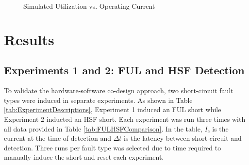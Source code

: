 \documentclass[11pt,oneside]{report}
\begin{document}
    \begin{figure}
    \centering
        \caption{Simulated Utilization vs. Operating Current}
        \label{fig:Simulated Utilization}
    \end{figure}

    \chapter{Results}\label{chap:results}
    \section{Experiments 1 and 2: FUL and HSF Detection}
    To validate the hardware-software co-design approach, two short-circuit fault types were induced in separate experiments. As shown in Table \ref{tab:ExperimentDescriptions}, Experiment 1 induced an FUL short while Experiment 2 inducted an HSF short. Each experiment was run three times with all data provided in Table \ref{tab:FULHSFComparison}. In the table, $I_{c}$ is the current at the time of detection and $\Delta t$ is the latency between short-circuit and detection. Three runs per fault type was selected due to time required to manually induce the short and reset each experiment.
    
\end{document}
